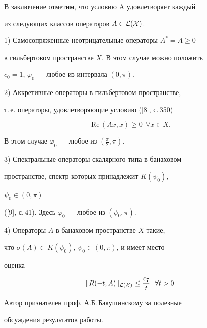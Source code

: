 В заключение отметим, что условию A удовлетворяет каждый 


из следующих классов операторов $A\in{\cal L(X)}$.





1) Самосопряженные неотрицательные операторы $A^*=A\ge0$


в гильбертовом пространстве $X$. В этом случае можно положить 


$c_0=1$, $\varphi_0$ --- любое из интервала $(0,\pi)$.





2) Аккретивные операторы в гильбертовом пространстве, 


т.\,е. операторы, удовлетворяющие условию ([8], с.\,350)


$$


\text{Re}\,(A x,x)\ge 0\ \ \forall x\in X.


$$


В этом случае $\varphi_0$ --- любое из $(\frac{\pi}{2},\pi)$.





3) Спектральные операторы скалярного типа в банаховом 


пространстве, спектр которых принадлежит $K(\psi_0)$, 


$\psi_0\in(0,\pi)$


([9], с.\,41). Здесь $\varphi_0$ --- любое из $(\psi_0,\pi)$.





4) Операторы $A$ в банаховом пространстве $X$ такие,


что $\sigma(A)\subset K(\psi_0)$, $\psi_0\in(0,\pi)$, и имеет место 


оценка


$$


\|R(-t,A)\|_\CL\le\frac{c_7}{t}\ \  \forall t>0.


$$





Автор признателен проф. А.Б.\,Бакушинскому за полезные


обсуждения результатов работы.








